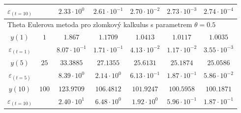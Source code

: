 \documentclass[a4paper,12pt,twoside]{article}
\theoremstyle{definition}
\theoremstyle{remark}
\numberwithin{equation}{section}
\numberwithin{table}{section}
\numberwithin{figure}{section}
\begin{document}
\begin{table}[h!]
\begin{tabular}{|c||c|c|c|c|c|c|}
		\hline
		$\varepsilon_{\left(t=10\right)}$ & & $ 2.33 \cdot 10^{0}$ & $2.61 \cdot 10^{-1}$ & $2.70 \cdot 10^{-2}$ & $2.73\cdot 10^{-3}$ & $2.74 \cdot 10^{-4}$ \\
		\hline\hline
		\multicolumn{7}{|l|}{Theta Eulerova metoda pro zlomkový kalkulus s parametrem $\theta = 0.5$} \\
		\hline
		$y\left(1\right)$ & $1$ & $1.867$ & $1.1709$ & $1.0413$ & $1.0117$ & $1.0035$  \\
		\hline
		$\varepsilon_{\left(t=1\right)}$ &  & $8.07 \cdot 10^{-1}$ & $1.71 \cdot 10^{-1}$ & $4.13 \cdot 10^{-2}$ & $1.17\cdot 10^{-2}$ & $3.55\cdot 10^{-3}$ \\
		\hline
		$y\left(5\right)$ & $25$ & $33.3885$ & $27.1355$ & $25.6131$ & $25.1874$ & $25.0586$  \\
		\hline
		$\varepsilon_{\left(t=5\right)}$ & & $ 8.39 \cdot 10^{0}$ & $2.14 \cdot 10^{0}$ & $6.13 \cdot 10^{-1}$ & $1.87\cdot 10^{-1}$ & $5.86 \cdot 10^{-2}$ \\
		\hline
		$y\left(10\right)$ & $100$ & $123.9709$ & $106.4812$ & $101.9247$ & $100.5958$ & $100.1871$  \\
		\hline
		$\varepsilon_{\left(t=10\right)}$ & & $ 2.40 \cdot 10^{1}$ & $6.48 \cdot 10^{0}$ & $1.92 \cdot 10^{0}$ & $5.96\cdot 10^{-1}$ & $1.87 \cdot 10^{-1}$ \\
		\hline
	\end{tabular}
\end{table}
\end{document}
